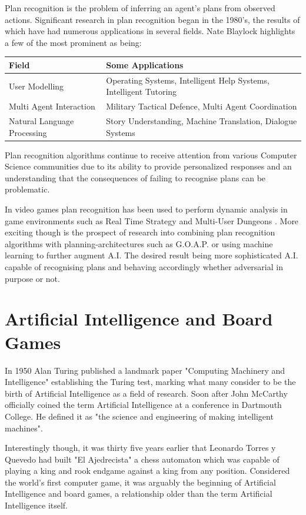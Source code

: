 \documentclass[parskip]{cs4rep}
\begin{document}
Plan recognition is the problem of inferring an agent's plans from observed actions. Significant research in plan recognition began in the 1980's, the results of which have had numerous applications in several fields. Nate Blaylock highlights \cite{oai:CiteSeerPSU:538953} a few of the most prominent as being:

\begin{tabular}{|l|p{8cm}|}
\hline 
\textbf{Field} & \textbf{Some Applications} \\ 
\hline 
User Modelling & Operating Systems, Intelligent Help Systems, Intelligent Tutoring \\ 
\hline 
Multi Agent Interaction & Military Tactical Defence, Multi Agent Coordination \\ 
\hline 
Natural Language Processing & Story Understanding, Machine Translation, Dialogue Systems \\ 
\hline
\end{tabular} 

Plan recognition algorithms continue to receive attention from various Computer Science communities due to its ability to provide personalized responses and an understanding that the consequences of failing to recognise plans can be problematic.

In video games plan recognition has been used to perform dynamic analysis in game environments such as Real Time Strategy \cite{conf/aiide/SynnaeveB11} and Multi-User Dungeons \cite{Albrecht:1998:BMK:598277.598308}. More exciting though is the prospect of research into combining plan recognition algorithms with planning-architectures such as G.O.A.P. or using machine learning to further augment A.I. The desired result being more sophisticated A.I. capable of recognising plans and behaving accordingly whether adversarial in purpose or not.

\section{Artificial Intelligence and Board Games}

In 1950 Alan Turing published a landmark paper "Computing Machinery and Intelligence" establishing the Turing test, marking what many consider to be the birth of Artificial Intelligence as a field of research. Soon after John McCarthy officially coined the term Artificial Intelligence at a conference in Dartmouth College. He defined it as "the science and engineering of making intelligent machines".

Interestingly though, it was thirty five years earlier that Leonardo Torres y Quevedo had built "El Ajedrecista" a chess automaton which was capable of playing a king and rook endgame against a king from any position. Considered the world's first computer game, it was arguably the beginning of Artificial Intelligence and board games, a relationship older than the term Artificial Intelligence itself. 
\end{document}

